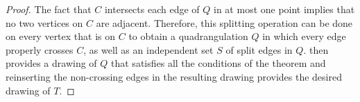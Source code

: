 \documentclass{patmorin}
\begin{document}
\begin{proof}
   The fact that $C$ intersects each edge of $Q$ in at most one point
   implies that no two vertices on $C$ are adjacent.
   Therefore, this splitting
   operation can be done on every vertex that is on $C$ to obtain
   a quadrangulation $Q$ in which every edge properly crosses $C$,
   as well as an independent set $S$ of split edges in $Q$.  
   then provides a drawing of $Q$ that satisfies all the conditions of
   the theorem and reinserting the non-crossing edges in the resulting
   drawing provides the desired drawing of $T$.
%
%
%
%
%
%
%

\end{proof}
\end{document}
